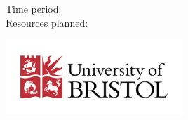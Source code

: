 \begin{titlepage}
    
    \footnotesize{Time period: \timePeriod}
    \\[0.3cm]
    \footnotesize{Resources planned: \resourcesPlanned}
    \vfill
    \homepage
    
    \vfill
    
	
	\vfill\vfill
	\includegraphics[width=0.5\textwidth]{./logo.jpg}
	\vfill
	 
	\vfill
	
\end{titlepage}

